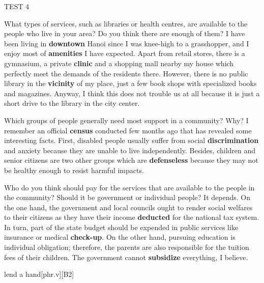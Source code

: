 \begin{glossarymc}[Cambridge 9]
\begin{test}{TEST 4}
    \begin{qa}{What types of services, such as libraries or health centres, are available to the people who live in your area? Do you think there are enough of them?}
    I have been living in \textbf{downtown} Hanoi since I was knee-high to a grasshopper, and I enjoy most of \textbf{amenities} I have expected. Apart from retail stores, there is a gymnasium, a private \textbf{clinic} and a shopping mall nearby my house which perfectly meet the demands of the residents there. However, there is no public library in the \textbf{vicinity} of my place, just a few book shops with specialized books and magazines. Anyway, I think this does not trouble us at all because it is just a short drive to the library in the city center.
    \end{qa}

    \begin{qa}{Which groups of people generally need most support in a community? Why?}
    I remember an official \textbf{census} conducted few months ago that has revealed some interesting facts. First, disabled people usually suffer from social \textbf{discrimination} and anxiety because they are unable to live independently. Besides, children and senior citizens are two other groups which are \textbf{defenseless} because they may not be healthy enough to resist harmful impacts.
    \end{qa}

    \begin{qa}{Who do you think should pay for the services that are available to the people in the community? Should it be government or individual people?}
    It depends. On the one hand, the government and local councils ought to render social welfares to their citizens as they have their income \textbf{deducted} for the national tax system. In turn, part of the state budget should be expended in public services like insurance or medical \textbf{check-up}. On the other hand, pursuing education is individual obligation; therefore, the parents are also responsible for the tuition fees of their children. The government cannot \textbf{subsidize} everything, I believe.
    \end{qa}

        \begin{VocabExplain}[Part 3]
            \begin{ExplainCard}{lend a hand}[phr.v][B2]
            \end{ExplainCard}


\end{VocabExplain}
\end{test}
\end{glossarymc}
